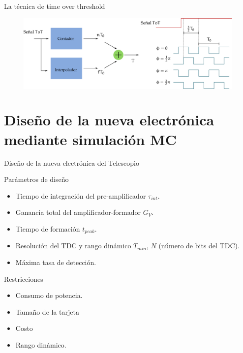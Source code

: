 \documentclass[spanish,aspectratio=169]{beamer}
\begin{document}
\begin{frame}{La técnica de time over threshold}

\begin{figure}
        \centering
        \includegraphics[width=\textwidth]{tdc-diagram.pdf}
\end{figure}

\end{frame}

\section{Diseño de la nueva electrónica mediante simulación MC}


\begin{frame}{Diseño de la nueva electrónica del Telescopio}

\begin{block}{Parámetros de diseño}

\begin{itemize}
	\item Tiempo de integración del pre-amplificador $\tau_{int}$.
	\item Ganancia total del amplificador-formador $G_{V}$.
	\item Tiempo de formación $t_{peak}$.
	\item Resolución del TDC y rango dinámico $T_{min}$, $N$ (número de bits del TDC).
	\item Máxima tasa de detección.
\end{itemize}

\end{block}

\begin{block}{Restricciones}

\begin{itemize}
	\item Consumo de potencia.
	\item Tamaño de la tarjeta
	\item Costo
	\item Rango dinámico.

\end{itemize}

\end{block}

\end{frame}
\end{document}
